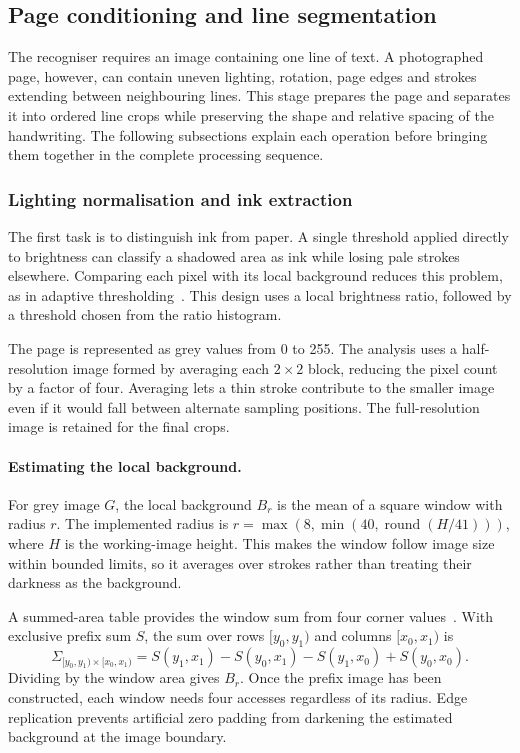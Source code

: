 \subsection{Page conditioning and line segmentation}
\label{sec:des-seg}
The recogniser requires an image containing one line of text. A photographed page, however, can contain uneven lighting, rotation, page edges and strokes extending between neighbouring lines. This stage prepares the page and separates it into ordered line crops while preserving the shape and relative spacing of the handwriting. The following subsections explain each operation before bringing them together in the complete processing sequence.

\subsubsection{Lighting normalisation and ink extraction}
The first task is to distinguish ink from paper. A single threshold applied directly to brightness can classify a shadowed area as ink while losing pale strokes elsewhere. Comparing each pixel with its local background reduces this problem, as in adaptive thresholding~\cite[pp.~2--3]{bradley2007}. This design uses a local brightness ratio, followed by a threshold chosen from the ratio histogram.

The page is represented as grey values from 0 to 255. The analysis uses a half-resolution image formed by averaging each $2\times2$ block, reducing the pixel count by a factor of four. Averaging lets a thin stroke contribute to the smaller image even if it would fall between alternate sampling positions. The full-resolution image is retained for the final crops.

\paragraph{Estimating the local background.}
For grey image $G$, the local background $B_r$ is the mean of a square window with radius $r$. The implemented radius is $r=\max(8,\min(40,\operatorname{round}(H/41)))$, where $H$ is the working-image height. This makes the window follow image size within bounded limits, so it averages over strokes rather than treating their darkness as the background.

A summed-area table provides the window sum from four corner values~\cite[p.~2]{bradley2007}. With exclusive prefix sum $S$, the sum over rows $[y_0,y_1)$ and columns $[x_0,x_1)$ is
\begin{equation}
\Sigma_{[y_0,y_1)\times[x_0,x_1)}=
S(y_1,x_1)-S(y_0,x_1)-S(y_1,x_0)+S(y_0,x_0).
\label{eq:des-integral}
\end{equation}
Dividing by the window area gives $B_r$. Once the prefix image has been constructed, each window needs four accesses regardless of its radius. Edge replication prevents artificial zero padding from darkening the estimated background at the image boundary.

